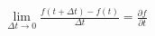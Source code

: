 \documentclass[preview]{standalone}
\begin{document}
\begin{align*}
\lim_{\Delta t \to 0} \frac{f(t+\Delta t) - f(t)}{\Delta t} = \frac{\partial f}{\partial t}
\end{align*}
\end{document}
